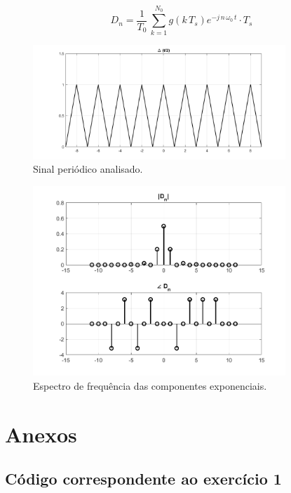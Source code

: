 \documentclass[a4paper,12pt,oneside,openany,table,xcdraw]{article}
\begin{document}
\vspace{0.2cm}
\begin{equation} \label{sfexp:Dn-discreto}
D_n = \dfrac{1}{T_0}\, \sum_{k=1} ^{N_0} g(k\, T_s) e ^{-j\, n\, \omega_0\, t} \cdot T_s
\end{equation}


\vspace{0.4cm}
\begin{figure}[H]
\centering
\includegraphics[width=0.85\textwidth]{ex5-sinal}
\caption{Sinal periódico analisado.}
\label{ex5:sinal}
\end{figure}

\vspace{0.4cm}
\begin{figure}[H]
\centering
\includegraphics[width=0.85\textwidth]{ex5-sinais-Dn}
\caption{Espectro de frequência das componentes exponenciais.}
\label{ex5:Dn}
\end{figure}
 
\newpage
\section{Anexos}
\subsection{Código correspondente ao exercício 1} \label{anexo:ex1}

\vspace{0.3cm}
\end{document}
